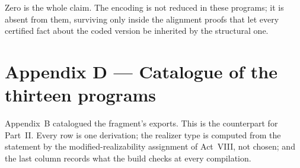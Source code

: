 \documentclass[11pt]{article}
\begin{document}
\noindent
Zero is the whole claim. The encoding is not reduced in these programs; it is
absent from them, surviving only inside the alignment proofs that let every
certified fact about the coded version be inherited by the structural one.

\section{Appendix D --- Catalogue of the thirteen \haomega{} programs}
\label{app:catalogue2}

Appendix~B catalogued the fragment's exports. This is the counterpart for
Part~II. Every row is one derivation; the realizer type is computed from the
statement by the modified-realizability assignment of Act~VIII, not chosen; and
the last column records what the build checks at every compilation.
\end{document}
